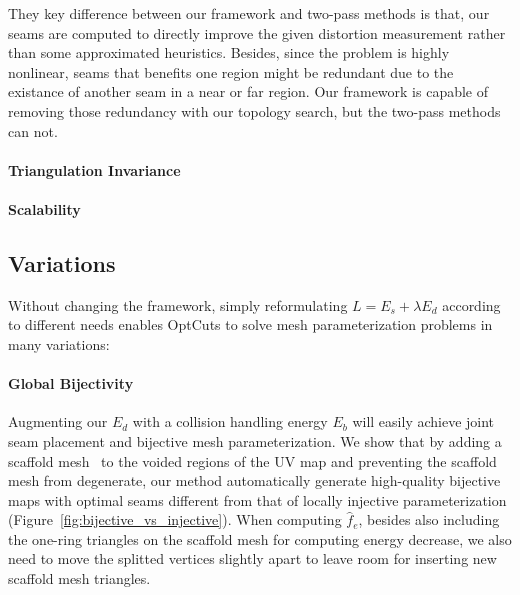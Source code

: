 They key difference between our framework and two-pass methods is that, our seams are computed to directly improve the given distortion measurement rather than some approximated heuristics. Besides, since the problem is highly nonlinear, seams that benefits one region might be redundant due to the existance of another seam in a near or far region. Our framework is capable of removing those redundancy with our topology search, but the two-pass methods can not.

\paragraph{Triangulation Invariance} 

\paragraph{Scalability} \minchen{[TODO]}

\subsection{Variations}
\label{sec:results_variations}

Without changing the framework, simply reformulating $L = E_s + \lambda E_d$ according to different needs enables OptCuts to solve mesh parameterization problems in many variations:

\paragraph{Global Bijectivity}  \minchen{[DOING]} Augmenting our $E_d$ with a collision handling energy $E_b$ will easily achieve joint seam placement and bijective mesh parameterization. We show that by adding a scaffold mesh~\cite{Jiang2017Simplicial} to the voided regions of the UV map and preventing the scaffold mesh from degenerate, our method automatically generate high-quality bijective maps with optimal seams different from that of locally injective parameterization (Figure~\ref{fig:bijective_vs_injective}). When computing $\hat{f}_e$, besides also including the one-ring triangles on the scaffold mesh for computing energy decrease, we also need to move the splitted vertices slightly apart to leave room for inserting new scaffold mesh triangles.

